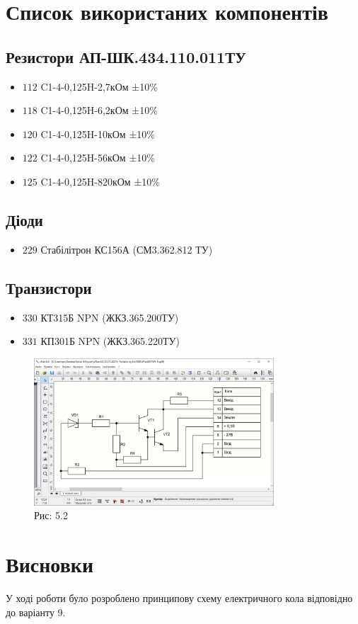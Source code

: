 \documentclass[a4paper]{article}
\begin{document}
\section*{Список використаних компонентів}
\subsection*{Резистори АП-ШК.434.110.011ТУ}
\begin{itemize}
    \item $112$ C1-4-0,125H-2,7кОм ±10\%
    \item $118$ C1-4-0,125H-6,2кОм ±10\%
    \item $120$ C1-4-0,125H-10кОм ±10\%
    \item $122$ C1-4-0,125H-56кОм ±10\%
    \item $125$ C1-4-0,125H-820кОм ±10\%
\end{itemize}

\subsection*{Діоди}
\begin{itemize}
    \item $229$ Стабілітрон КС156А (СМ3.362.812 ТУ)
\end{itemize}

\subsection*{Транзистори}
\begin{itemize}
    \item $330$ КТ315Б NPN (ЖКЗ.365.200ТУ)
    \item $331$ КП301Б NPN (ЖКЗ.365.220ТУ)
\end{itemize}

\begin{figure}[h]
    \centering
    \includegraphics[width=0.8\textwidth]{imgs/PW5.png}
    \caption*{Рис: 5.2}
\end{figure}



\section*{Висновки}
У ході роботи було розроблено принципову схему електричного кола відповідно до варіанту 9.
\end{document}

